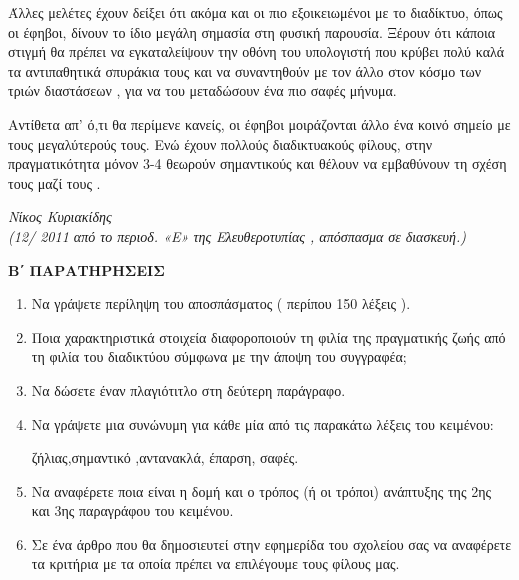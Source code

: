 \documentclass[twoside,nofonts,internet,fil,maria]{frontisthrio-diag}
\begin{document}
Άλλες μελέτες έχουν δείξει ότι ακόμα και οι πιο εξοικειωμένοι με το διαδίκτυο,
όπως οι έφηβοι, δίνουν το ίδιο μεγάλη σημασία στη φυσική παρουσία. Ξέρουν ότι
κάποια στιγμή θα πρέπει να εγκαταλείψουν την οθόνη του υπολογιστή που κρύβει
πολύ καλά τα αντιπαθητικά σπυράκια τους και να συναντηθούν με τον άλλο στον
κόσμο των τριών διαστάσεων , για να του μεταδώσουν ένα πιο σαφές μήνυμα.

Αντίθετα απ’ ό,τι θα περίμενε κανείς, οι έφηβοι μοιράζονται άλλο ένα κοινό σημείο
με τους μεγαλύτερούς τους. Ενώ έχουν πολλούς διαδικτυακούς φίλους, στην
πραγματικότητα μόνον 3-4 θεωρούν σημαντικούς και θέλουν να εμβαθύνουν τη
σχέση τους μαζί τους .
\begin{flushright}
\begin{minipage}{5.5cm}
\begin{flushleft}
\textit{Νίκος Κυριακίδης\\
(12/ 2011 από το περιοδ. «Ε» της Ελευθεροτυπίας , απόσπασμα σε διασκευή.)}
\end{flushleft}
\end{minipage}
\end{flushright}
\textcolor{\xrwma}{\textbf{Β΄ ΠΑΡΑΤΗΡΗΣΕΙΣ}}
\begin{enumerate}
\item Να γράψετε περίληψη του αποσπάσματος ( περίπου 150 λέξεις ).
\item Ποια χαρακτηριστικά στοιχεία διαφοροποιούν τη φιλία της πραγματικής ζωής από τη φιλία του διαδικτύου σύμφωνα με την άποψη του συγγραφέα;\\ 
\item Να δώσετε  έναν πλαγιότιτλο στη δεύτερη παράγραφο.
\item Να γράψετε μια συνώνυμη για κάθε μία από τις παρακάτω λέξεις του κειμένου: 
 \begin{center}
ζήλιας,σημαντικό ,αντανακλά, έπαρση, σαφές.
\end{center} 
\item Να αναφέρετε ποια είναι η δομή και ο τρόπος (ή οι τρόποι) ανάπτυξης της
2ης και 3ης παραγράφου του κειμένου.
\item Σε ένα άρθρο που θα δημοσιευτεί στην εφημερίδα του σχολείου σας να αναφέρετε τα κριτήρια με τα οποία πρέπει να επιλέγουμε τους φίλους μας. 
\end{enumerate}
\end{document}
